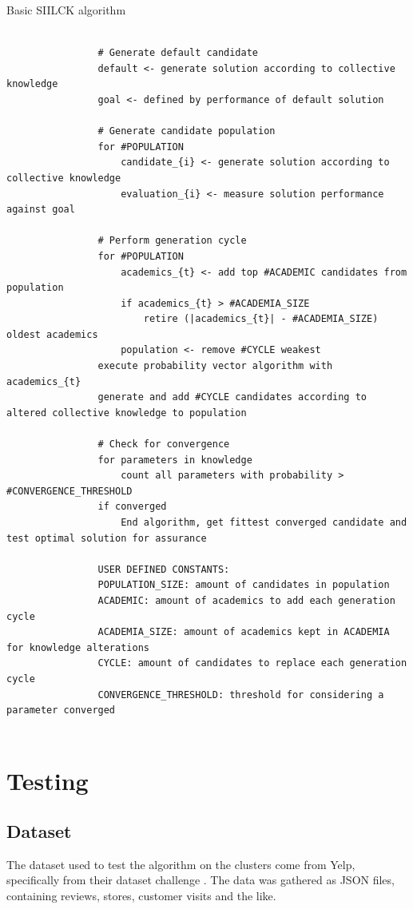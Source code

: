 \documentclass[a4paper,english]{report}
\begin{document}
			\begin{algorithm}
				\caption{Basic SIILCK algorithm}\label{algo:overview}
				\scriptsize
				\begin{verbatim}
				
				# Generate default candidate
				default <- generate solution according to collective knowledge
				goal <- defined by performance of default solution
				
				# Generate candidate population
				for #POPULATION
				    candidate_{i} <- generate solution according to collective knowledge
				    evaluation_{i} <- measure solution performance against goal
				    
				# Perform generation cycle
				for #POPULATION
				    academics_{t} <- add top #ACADEMIC candidates from population
				    if academics_{t} > #ACADEMIA_SIZE
				        retire (|academics_{t}| - #ACADEMIA_SIZE) oldest academics
					population <- remove #CYCLE weakest
				execute probability vector algorithm with academics_{t}
				generate and add #CYCLE candidates according to altered collective knowledge to population
				
				# Check for convergence
				for parameters in knowledge
				    count all parameters with probability > #CONVERGENCE_THRESHOLD
				if converged
				    End algorithm, get fittest converged candidate and test optimal solution for assurance
				
				USER DEFINED CONSTANTS:
				POPULATION_SIZE: amount of candidates in population
				ACADEMIC: amount of academics to add each generation cycle
				ACADEMIA_SIZE: amount of academics kept in ACADEMIA for knowledge alterations
				CYCLE: amount of candidates to replace each generation cycle
				CONVERGENCE_THRESHOLD: threshold for considering a parameter converged
				
				\end{verbatim}
			\end{algorithm}
		\section{Testing}
			\subsection{Dataset}
				The dataset used to test the algorithm on the clusters come from Yelp, specifically from their dataset challenge \cite{yelp}. The data was gathered as JSON files, containing reviews, stores, customer visits and the like.
\end{document}
